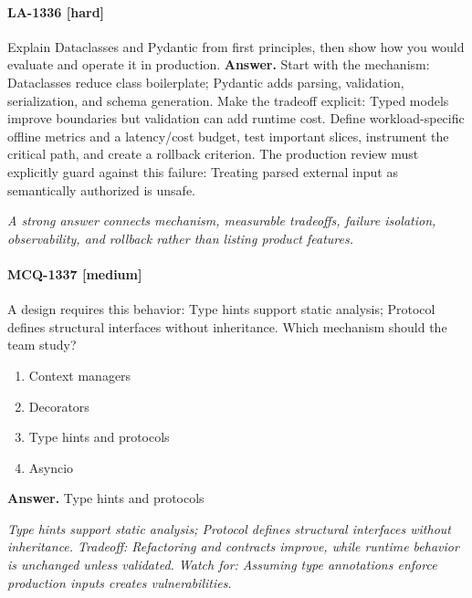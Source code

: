 \paragraph{LA-1336 [hard]} Explain Dataclasses and Pydantic from first principles, then show how you would evaluate and operate it in production.
\noindent\textbf{Answer.} Start with the mechanism: Dataclasses reduce class boilerplate; Pydantic adds parsing, validation, serialization, and schema generation. Make the tradeoff explicit: Typed models improve boundaries but validation can add runtime cost. Define workload-specific offline metrics and a latency/cost budget, test important slices, instrument the critical path, and create a rollback criterion. The production review must explicitly guard against this failure: Treating parsed external input as semantically authorized is unsafe.
\par\textit{A strong answer connects mechanism, measurable tradeoffs, failure isolation, observability, and rollback rather than listing product features.}
\paragraph{MCQ-1337 [medium]} A design requires this behavior: Type hints support static analysis; Protocol defines structural interfaces without inheritance. Which mechanism should the team study?
\begin{enumerate}[label=\Alph*.]
\item Context managers
\item Decorators
\item Type hints and protocols
\item Asyncio
\end{enumerate}
\noindent\textbf{Answer.} Type hints and protocols
\par\textit{Type hints support static analysis; Protocol defines structural interfaces without inheritance. Tradeoff: Refactoring and contracts improve, while runtime behavior is unchanged unless validated. Watch for: Assuming type annotations enforce production inputs creates vulnerabilities.}
